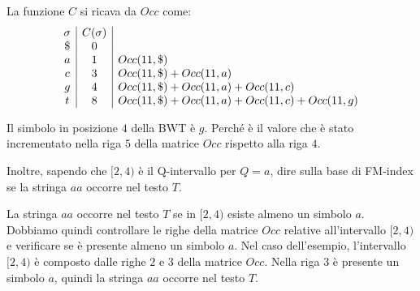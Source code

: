 \begin{esempio}
    La funzione $C$ si ricava da $Occ$ come:
    \begin{equation}
        \begin{array}{c | c | l}
            \sigma & C(\sigma) &                                                    \\
            \$     & 0         &                                                    \\
            a      & 1         & Occ(11, \$)                                        \\
            c      & 3         & Occ(11, \$) + Occ(11, a)                           \\
            g      & 4         & Occ(11, \$) + Occ(11, a) + Occ(11, c)              \\
            t      & 8         & Occ(11, \$) + Occ(11, a) + Occ(11, c) + Occ(11, g) \\
        \end{array}
    \end{equation}

    Il simbolo in posizione $4$ della BWT è $g$. Perché è il valore che è stato
    incrementato nella riga $5$ della matrice $Occ$ rispetto alla riga $4$.

    Inoltre, sapendo che $[2, 4)$ è il Q-intervallo per $Q = a$, dire sulla base
    di FM-index se la stringa $aa$ occorre nel testo $T$.

    La stringa $aa$ occorre nel testo $T$ se in $[2, 4)$ esiste almeno un simbolo
    $a$. Dobbiamo quindi controllare le righe della matrice $Occ$ relative
    all'intervallo $[2, 4)$ e verificare se è presente almeno un simbolo $a$.
    Nel caso dell'esempio, l'intervallo $[2, 4)$ è composto dalle righe $2$ e $3$
    della matrice $Occ$. Nella riga $3$ è presente un simbolo $a$, quindi la
    stringa $aa$ occorre nel testo $T$.
\end{esempio}